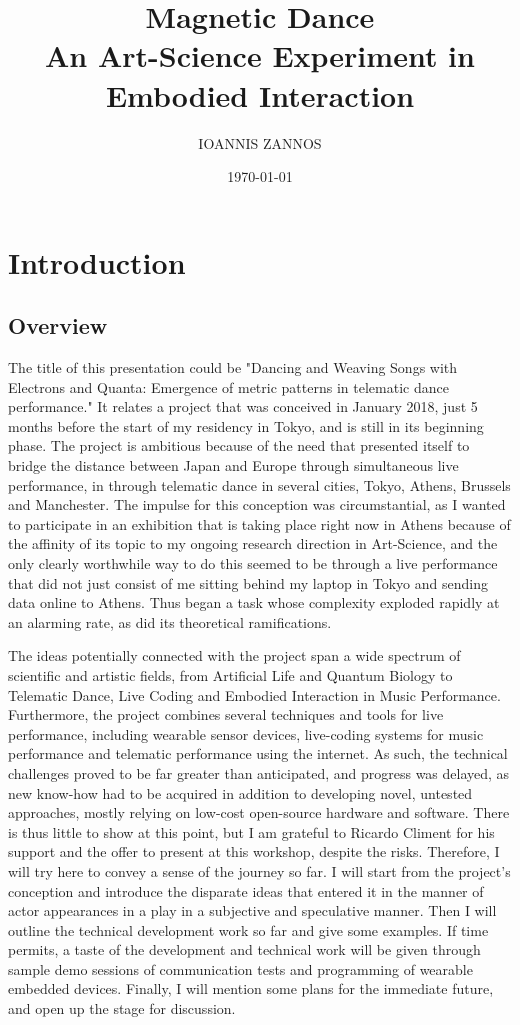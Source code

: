 \documentclass[11pt]{article}
\author{IOANNIS ZANNOS}
\date{\today}
\title{Magnetic Dance\\\medskip
\large An Art-Science Experiment in Embodied Interaction}
\begin{document}
\maketitle
\tableofcontents


\section{Introduction}
\label{sec:orgf3ec34f}

\subsection{Overview}
\label{sec:orgfe550c8}
The title of this presentation could be "Dancing and Weaving Songs with Electrons and Quanta:  Emergence of metric patterns in telematic dance performance."  It relates a project that was conceived in January 2018, just 5 months before the start of my residency in Tokyo, and is still in its beginning phase.  The project is ambitious because of the need that presented itself to bridge the distance between Japan and Europe through simultaneous live performance, in through telematic dance in several cities, Tokyo, Athens, Brussels and Manchester.  The impulse for this conception was circumstantial, as I wanted to participate in an exhibition that is taking place right now in Athens because of the affinity of its topic to my ongoing research direction in Art-Science, and the only clearly worthwhile way to do this seemed to be through a live performance that did not just consist of me sitting behind my laptop in Tokyo and sending data online to Athens.  Thus began a task whose complexity exploded rapidly at an alarming rate, as did its theoretical ramifications.  

The ideas potentially connected with the project span a wide spectrum of scientific and artistic fields, from Artificial Life and Quantum Biology to Telematic Dance, Live Coding and Embodied Interaction in Music Performance.  Furthermore, the project combines several techniques and tools for live performance, including wearable sensor devices, live-coding systems for music performance and telematic performance using the internet.  As such, the technical challenges proved to be far greater than anticipated, and progress was delayed, as new know-how had to be acquired in addition to developing novel, untested approaches, mostly relying on low-cost open-source hardware and software.  There is thus little to show at this point, but I am grateful to Ricardo Climent for his support and the offer to present at this workshop, despite the risks.  Therefore, I will try here to convey a sense of the journey so far. I will start from the project's conception and introduce the disparate ideas that entered it in the manner of actor appearances in a play in a subjective and speculative manner.  Then I will outline the technical development work so far and give some examples.  If time permits, a taste of the development and technical work will be given through sample demo sessions of communication tests and programming of wearable embedded devices. Finally, I will mention some plans for the immediate future, and open up the stage for discussion.  
\end{document}
